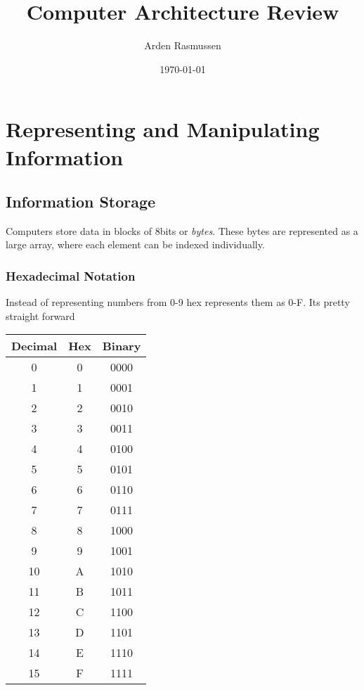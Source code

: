 \documentclass[10pt]{armath}
\title{Computer Architecture Review}
\author{Arden Rasmussen}
\date{\today}
\begin{document}
\maketitle

\section{Representing and Manipulating Information}%
\label{sec:representing_and_manipulating_information}

\subsection{Information Storage}%
\label{sub:information_storage}

Computers store data in blocks of 8bits or \textit{bytes}. These bytes are
represented as a large array, where each element can be indexed individually.

\subsubsection{Hexadecimal Notation}%
\label{ssub:hexadecimal_notation}

Instead of representing numbers from 0-9 hex represents them as 0-F. Its
pretty straight forward

\begin{center}
  \begin{tabular}{c c c}
    Decimal & Hex & Binary\\
    \hline
    0 & 0 & 0000\\
    1 & 1 & 0001\\
    2 & 2 & 0010\\
    3 & 3 & 0011\\
    4 & 4 & 0100\\
    5 & 5 & 0101\\
    6 & 6 & 0110\\
    7 & 7 & 0111\\
    8 & 8 & 1000\\
    9 & 9 & 1001\\
    10 & A & 1010\\
    11 & B & 1011\\
    12 & C & 1100\\
    13 & D & 1101\\
    14 & E & 1110\\
    15 & F & 1111\\
    \hline
  \end{tabular}
\end{center}
\end{document}
